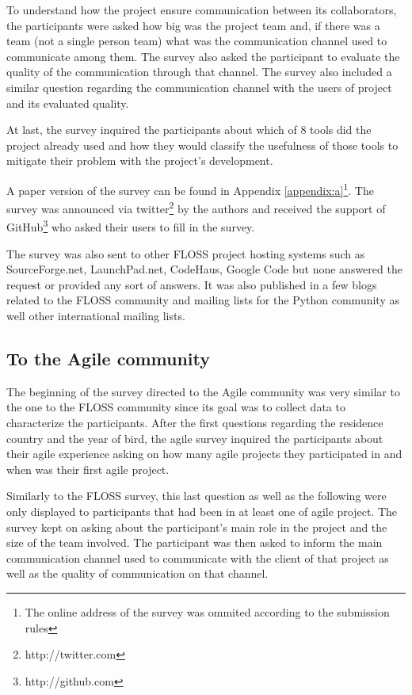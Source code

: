 \documentclass[lnbip]{svmultln}
\begin{document}
To understand how the project ensure communication between its
collaborators, the participants were asked how big was the project
team and, if there was a team (not a single person team) what was the
communication channel used to communicate among them. The survey also
asked the participant to evaluate the quality of the communication
through that channel. The survey also included a similar question
regarding the communication channel with the users of project and its
evaluated quality.

At last, the survey inquired the participants about which of 8 tools
did the project already used and how they would classify the
usefulness of those tools to mitigate their problem with the project's
development.

A paper version of the survey can be found in Appendix
\ref{appendix:a}\footnote{The online address of the survey was ommited
  according to the submission rules}.
The survey was announced via twitter\footnote{http://twitter.com} by
the authors and received the support of
GitHub\footnote{http://github.com} who asked their users to fill in
the survey.

The survey was also sent to other FLOSS project hosting systems such
as SourceForge.net, LaunchPad.net, CodeHaus, Google Code but none
answered the request or provided any sort of answers.  It was also
published in a few blogs related to the FLOSS community and mailing
lists for the Python community as well other international mailing
lists.

\subsection{To the Agile community}
\label{subsec:agile-survey}

The beginning of the survey directed to the Agile community was very
similar to the one to the FLOSS community since its goal was to
collect data to characterize the participants.  After the first
questions regarding the residence country and the year of bird, the
agile survey inquired the participants about their agile experience
asking on how many agile projects they participated in and when was
their first agile project.

Similarly to the FLOSS survey, this last question as well as the
following were only displayed to participants that had been in at
least one of agile project. The survey kept on asking about the
participant's main role in the project and the size of the team
involved. The participant was then asked to inform the main
communication channel used to communicate with the client of that
project as well as the quality of communication on that channel.
\end{document}
